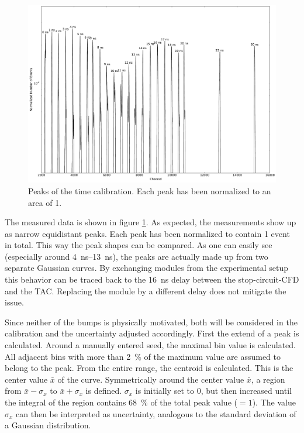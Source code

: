 \documentclass[
	paper=A4,
	parskip=full,
	chapterprefix=true,
	11pt,
	headings=normal,
	bibliography=totoc,
	listof=totoc,
	titlepage=on,
]{scrreprt}
\begin{document}
\begin{figure}
	\centering
	\includegraphics{calibration_peaks}
	\caption{Peaks of the time calibration. Each peak has been normalized to an area of \num{1}.}
	\label{fig:calibration_raw}
\end{figure}

The measured data is shown in figure \ref{fig:calibration_raw}. As expected, the measurements show up as narrow equidistant peaks. Each peak has been normalized to contain \num{1} event in total. This way the peak shapes can be compared. As one can easily see (especially around \SIrange{4}{13}{\nano\second}), the peaks are actually made up from two separate Gaussian curves. By exchanging modules from the experimental setup this behavior can be traced back to the \SI{16}{\nano\second} delay between the stop-circuit-CFD and the TAC. Replacing the module by a different delay does not mitigate the issue.

Since neither of the bumps is physically motivated, both will be considered in the calibration and the uncertainty adjusted accordingly.
First the extend of a peak is calculated. Around a manually entered seed, the maximal bin value is calculated. All adjacent bins with more than \SI{2}{\percent} of the maximum value are assumed to belong to the peak. From the entire range, the centroid is calculated. This is the center value $\bar{x}$ of the curve. Symmetrically around the center value $\bar{x}$, a region from $\bar{x}-\sigma_x$ to $\bar{x}+\sigma_x$ is defined. $\sigma_x$ is initially set to \num{0}, but then increased until the integral of the region contains \SI{68}{\percent} of the total peak value ($ = \num{1}$). The value $\sigma_x$ can then be interpreted as uncertainty, analogous to the standard deviation of a Gaussian distribution.
\end{document}

